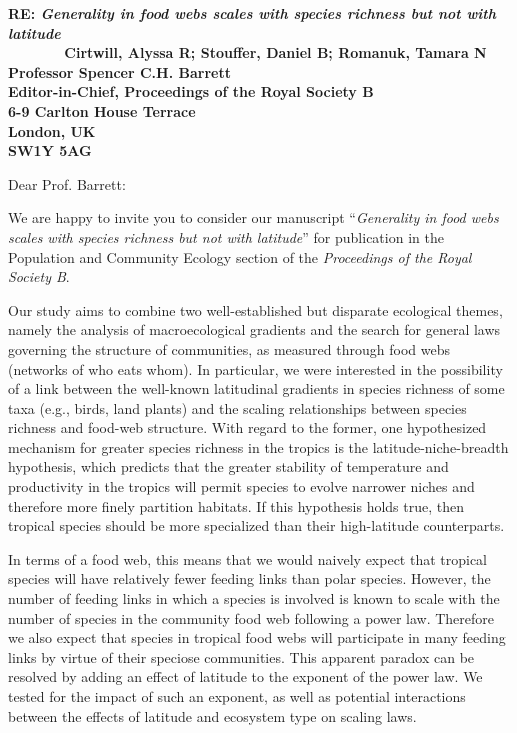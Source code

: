 \documentclass[12pt]{letter}
\newcommand{\mytitle}{\emph{Generality in food webs scales with species richness but not with latitude}}
\newcommand{\myjournal}{\emph{Proceedings of the Royal Society B}}
\begin{document}
\begin{letter}{\bf RE: \mytitle\\
               ~~~~~~~Cirtwill, Alyssa R; Stouffer, Daniel B; Romanuk, Tamara N\\
               \vspace*{20pt}
               Professor Spencer C.H. Barrett\\
               Editor-in-Chief, Proceedings of the Royal Society B\\
               6-9 Carlton House Terrace\\
               London, UK\\
               SW1Y 5AG\\
                }

\opening{Dear Prof. Barrett:}

We are happy to invite you to consider our manuscript 
``\mytitle'' for publication in the Population and Community Ecology section of the \emph{\myjournal}. 



Our study aims to combine two well-established but disparate ecological themes, namely the analysis of macroecological gradients and the search for general laws governing the structure of communities, as measured through food webs (networks of who eats whom). In particular, we were interested in the possibility of a link between the well-known latitudinal gradients in species richness of some taxa (e.g., birds, land plants) and the scaling relationships between species richness and food-web structure. With regard to the former, one  hypothesized mechanism for greater species richness in the tropics is the latitude-niche-breadth hypothesis, which predicts that the greater stability of temperature and productivity in the tropics will permit species to evolve narrower niches and therefore more finely partition habitats. If this hypothesis holds true, then tropical species should be more specialized than their high-latitude counterparts.

In terms of a food web, this means that we would naively expect that tropical species will have relatively fewer feeding links than polar species. However, the number of feeding links in which a species is involved is known to scale with the number of species in the community food web following a power law. Therefore we also expect that species in tropical food webs will participate in many feeding links by virtue of their speciose communities. This apparent paradox can be resolved by adding an effect of latitude to the exponent of the power law. We tested for the impact of such an exponent, as well as potential interactions between the effects of latitude and ecosystem type on scaling laws. 


\end{letter}
\end{document}
